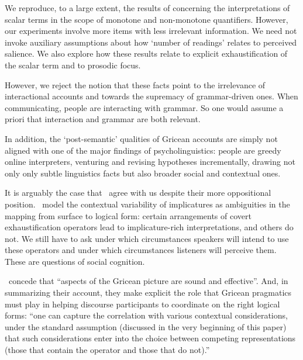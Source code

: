 \documentclass{article}
\begin{document}
\begin{examples}
\item We reproduce, to a large extent, the results of
  \citet{Chemla:Spector:2011} concerning the interpretations of scalar
  terms in the scope of monotone and non-monotone quantifiers.
  However, our experiments involve more items with less irrelevant
  information. We need not invoke auxiliary assumptions about how
  `number of readings' relates to perceived salience. We also explore
  how these results relate to explicit exhaustification of the scalar
  term and to prosodic focus.

\item However, we reject the notion that these facts point to the
  irrelevance of interactional accounts and towards the supremacy of
  grammar-driven ones. When communicating, people are interacting with
  grammar. So one would assume a priori that interaction and grammar
  are both relevant. 

\item In addition, the `post-semantic' qualities of Gricean accounts
  are simply not aligned with one of the major findings of
  psycholinguistics: people are greedy online interpreters, venturing
  and revising hypotheses incrementally, drawing not only only subtle
  linguistics facts but also broader social and contextual ones.

\item It is arguably the case that \CFS\ agree with us despite their
  more oppositional position.  \CFS\ model the contextual variability
  of implicatures as ambiguities in the mapping from surface to
  logical form: certain arrangements of covert exhaustification
  operators lead to implicature-rich interpretations, and others do
  not. We still have to ask under which circumstances speakers will
  intend to use these operators and under which circumstances
  listeners will perceive them. These are questions of social
  cognition.

\item \CFS\ concede that ``aspects of the Gricean picture are sound
  and effective''. And, in summarizing their account, they make
  explicit the role that Gricean pragmatics must play in helping
  discourse participants to coordinate on the right logical forms:
  ``one can capture the correlation with various contextual
  considerations, under the standard assumption (discussed in the very
  beginning of this paper) that such considerations enter into the
  choice between competing representations (those that contain the
  operator and those that do not).''


\end{examples}
\end{document}
